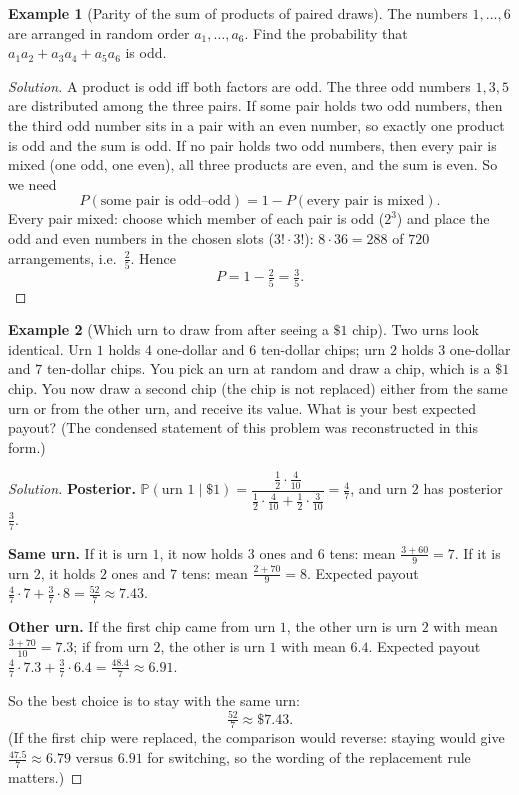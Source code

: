 \documentclass[11pt]{article}
\theoremstyle{definition}
\newtheorem{example}{Example}[section]
\begin{document}
\begin{example}[Parity of the sum of products of paired draws]
The numbers $1,\dots,6$ are arranged in random order $a_1,\dots,a_6$. Find the probability that $a_1a_2+a_3a_4+a_5a_6$ is odd.
\end{example}

\begin{proof}[Solution]
A product is odd iff both factors are odd. The three odd numbers $1,3,5$ are distributed among the three pairs. If some pair holds two odd numbers, then the third odd number sits in a pair with an even number, so exactly one product is odd and the sum is odd. If no pair holds two odd numbers, then every pair is mixed (one odd, one even), all three products are even, and the sum is even. So we need
\[
P(\text{some pair is odd--odd})=1-P(\text{every pair is mixed}).
\]
Every pair mixed: choose which member of each pair is odd ($2^3$) and place the odd and even numbers in the chosen slots ($3!\cdot3!$): $8\cdot36=288$ of $720$ arrangements, i.e.\ $\tfrac25$. Hence
\[
P=1-\tfrac25=\boxed{\tfrac35}.
\]
\end{proof}

\begin{example}[Which urn to draw from after seeing a $\$1$ chip]
Two urns look identical. Urn $1$ holds $4$ one-dollar and $6$ ten-dollar chips; urn $2$ holds $3$ one-dollar and $7$ ten-dollar chips. You pick an urn at random and draw a chip, which is a $\$1$ chip. You now draw a second chip (the chip is not replaced) either from the same urn or from the other urn, and receive its value. What is your best expected payout? (The condensed statement of this problem was reconstructed in this form.)
\end{example}

\begin{proof}[Solution]
\textbf{Posterior.} $\mathbb P(\text{urn }1\mid\$1)=\dfrac{\frac12\cdot\frac4{10}}{\frac12\cdot\frac4{10}+\frac12\cdot\frac3{10}}=\tfrac47$, and urn $2$ has posterior $\tfrac37$.

\textbf{Same urn.} If it is urn $1$, it now holds $3$ ones and $6$ tens: mean $\tfrac{3+60}9=7$. If it is urn $2$, it holds $2$ ones and $7$ tens: mean $\tfrac{2+70}9=8$. Expected payout $\tfrac47\cdot7+\tfrac37\cdot8=\tfrac{52}7\approx7.43$.

\textbf{Other urn.} If the first chip came from urn $1$, the other urn is urn $2$ with mean $\tfrac{3+70}{10}=7.3$; if from urn $2$, the other is urn $1$ with mean $6.4$. Expected payout $\tfrac47\cdot7.3+\tfrac37\cdot6.4=\tfrac{48.4}7\approx6.91$.

So the best choice is to stay with the same urn:
\[
\boxed{\tfrac{52}{7}\approx\$7.43}.
\]
(If the first chip were replaced, the comparison would reverse: staying would give $\tfrac{47.5}7\approx6.79$ versus $6.91$ for switching, so the wording of the replacement rule matters.)
\end{proof}
\end{document}
